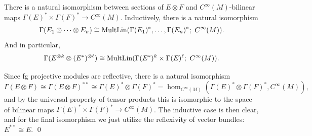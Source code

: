 \bthrm

    There is a natural isomorphism between sections of $E\otimes F$ and $C^\infty(M)$-bilinear maps $\Gamma(E)^*\times\Gamma(F)^*\to C^\infty(M)$.
    Inductively, there is a natural isomorphism
    $$ \Gamma(E_1\otimes\cdots\otimes E_n) \cong {\rm MultLin}(\Gamma(E_1)^*,\dots,\Gamma(E_n)^*;\ C^\infty(M)) . $$
    And in particular,
    $$ \Gamma(E^{\otimes k}\otimes (E^*)^{\otimes\ell}) \cong {\rm MultLin}(\Gamma(E^*)^k\times\Gamma(E)^\ell;\ C^\infty(M)) . $$

\ethrm

\bproof

    Since fg projective modules are reflective, there is a natural isomorphism
    $$ \Gamma(E\otimes F) \cong \Gamma(E\otimes F)^{**} \cong \Gamma(E)^*\otimes\Gamma(F)^* = \hom_{C^\infty(M)}(\Gamma(E)^*\otimes\Gamma(F)^*,C^\infty(M)) , $$
    and by the universal property of tensor products this is isomorphic to the space of bilinear maps $\Gamma(E)^*\times\Gamma(F)^*\to C^\infty(M)$.
    The inductive case is then clear, and for the final isomorphism we just utilize the reflexivity of vector bundles: $E^{**}\cong E$.
    \qed

\eproof

